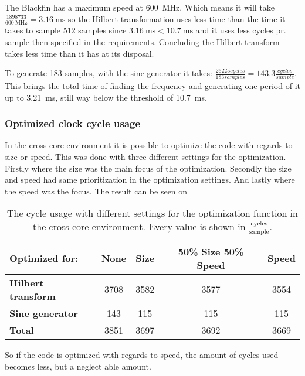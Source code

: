 The Blackfin has a maximum speed at \SI{600}{\mega\hertz}.
Which means it will take $\frac{\num{1898733}}{\SI{600}{\mega\hertz}} = {\SI{3.16}{\milli\second}}$ so the Hilbert transformation uses less time than the time it takes to sample 512 samples since $\SI{3.16}{\milli\second} < \SI{10.7}{\milli\second}$ and it uses less cycles pr. sample then specified in the requirements.
Concluding the Hilbert transform takes less time than it has at its disposal.

To generate 183 samples, with the sine generator it takes: $\frac{\num{26225} cycles}{183 samples} = \num{143.3}\frac{cycles}{sample}$.
This brings the total time of finding the frequency and generating one period of it up to \SI{3.21}{\milli\second}, still way below the threshold of \SI{10.7}{\milli\second}.

\subsubsection{Optimized clock cycle usage}
In the cross core environment it is possible to optimize the code with regards to size or speed.
This was done with three different settings for the optimization. 
Firstly where the size was the main focus of the optimization. 
Secondly the size and speed had same prioritization in the optimization settings.
And lastly where the speed was the focus. The result can be seen on
\begin{table}
	\centering
	\begin{tabularx}{0.95\textwidth}{l c c c c}
		\toprule
		{\textbf{Optimized for:}} & \textbf{None} & \textbf{Size} & \textbf{50\% Size 50\% Speed} & \textbf{Speed} \\
		\midrule
		\textbf{Hilbert transform} & \num{3708} & \num{3582} & \num{3577} & \num{3554} \\
		\textbf{Sine generator} & \num{143} & \num{115} & \num{115} & \num{115} \\
		\textbf{Total} & \num{3851} & \num{3697} & \num{3692} & \num{3669} \\
		\bottomrule
	\end{tabularx}
	\caption{The cycle usage with different settings for the optimization function in the cross core environment. Every value is shown in $\frac{\text{cycles}}{\text{sample}}$.}
	\label{OptimizedCycleUsage}
\end{table}

So if the code is optimized with regards to speed, the amount of cycles used becomes less, but a neglect able amount.  

\FloatBarrier